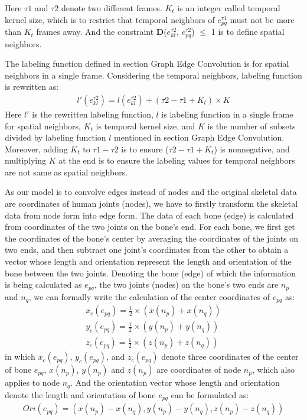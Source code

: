 \documentclass[a4paper,11pt]{article}
\begin{document}
Here $\tau 1$ and $\tau 2$ denote two different frames.
$K_{t}$ is an integer called temporal kernel size, which is to restrict that temporal neighbors of $e_{pq}^{\tau 1}$ must not be more than $K_{t}$ frames away. And the constraint {\bf D}($e_{kl}^{\tau2}$, $e_{pq}^{\tau2}$) $\leqslant$ 1 is to define spatial neighbors.

The labeling function defined in section Graph Edge Convolution is for spatial neighbors in a single frame. Considering the temporal neighbors, labeling function is rewritten as:
\begin{align}
&l'(e_{kl}^{\tau 2}) = l(e_{kl}^{\tau 2})+(\tau 2  - \tau 1 + K_t) \times K&
\end{align}
Here $l'$ is the rewritten labeling function, $l$ is labeling function in a single frame for spatial neighbors, $K_t$ is temporal kernel size, and $K$ is the number of subsets divided by labeling function $l$ mentioned in section Graph Edge Convolution. Moreover, adding $K_t$ to $\tau1-\tau2$ is to ensure (${\tau2-\tau1+K_t}$) is nonnegative, and multiplying $K$ at the end is to ensure the labeling values for temporal neighbors are not same as spatial neighbors.

As our model is to convolve edges instead of nodes and the original skeletal data are coordinates of human joints (nodes), we have to firstly transform the skeletal data from node form into edge form. The data of each bone (edge) is calculated from coordinates of the two joints on the bone's end. For each bone, we first get the coordinates of the bone's center by averaging the coordinates of the joints on two ends, and then subtract one joint's coordinates from the other to obtain a vector whose length and orientation represent the length and orientation of the bone between the two joints. Denoting the bone (edge) of which the information is being calculated as $e_{pq}$, the two joints (nodes) on the bone's two ends are $n_p$ and $n_q$, we can formally write the calculation of the center coordinates of $e_{pq}$ as:
\begin{align}
&x_c(e_{pq}) = \frac{1}{2} \times (x(n_p) + x(n_q))&\\
&y_c(e_{pq}) = \frac{1}{2} \times (y(n_p) + y(n_q))&\\
&z_c(e_{pq}) = \frac{1}{2} \times (z(n_p) + z(n_q))&
\end{align}
in which $x_c(e_{pq})$, $y_c(e_{pq})$, and $z_c(e_{pq})$ denote three coordinates of the center of bone $e_{pq}$, $x(n_p)$, $y(n_p)$ and $z(n_p)$ are coordinates of node $n_p$, which also applies to node $n_q$. And the orientation vector whose length and orientation denote the length and orientation of bone $e_{pq}$ can be formulated as:
\begin{align}
&Ori(e_{pq}) = (x(n_p) - x(n_q), y(n_p) - y(n_q), z(n_p) - z(n_q))&
\end{align}
\end{document}
